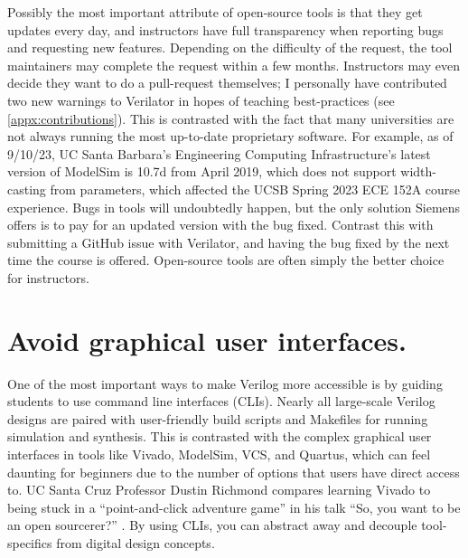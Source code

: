 Possibly the most important attribute of open-source tools is that they get updates every day, and instructors have full transparency when reporting bugs and requesting new features. Depending on the difficulty of the request, the tool maintainers may complete the request within a few months. Instructors may even decide they want to do a pull-request themselves; I personally have contributed two new warnings to Verilator in hopes of teaching best-practices (see \autoref{appx:contributions}). This is contrasted with the fact that many universities are not always running the most up-to-date proprietary software. For example, as of 9/10/23, UC Santa Barbara's Engineering Computing Infrastructure's latest version of ModelSim is 10.7d from April 2019, which does not support width-casting from parameters, which affected the UCSB Spring 2023 ECE 152A course experience. Bugs in tools will undoubtedly happen, but the only solution Siemens offers is to pay for an updated version with the bug fixed. Contrast this with submitting a GitHub issue with Verilator, and having the bug fixed by the next time the course is offered. Open-source tools are often simply the better choice for instructors.

\section{Avoid graphical user interfaces.}

One of the most important ways to make Verilog more accessible is by guiding students to use command line interfaces (CLIs). Nearly all large-scale Verilog designs are paired with user-friendly build scripts and Makefiles for running simulation and synthesis. This is contrasted with the complex graphical user interfaces in tools like Vivado, ModelSim, VCS, and Quartus, which can feel daunting for beginners due to the number of options that users have direct access to. UC Santa Cruz Professor Dustin Richmond compares learning Vivado to being stuck in a \enquote{point-and-click adventure game} in his talk \enquote{So, you want to be an open sourcerer?} \cite{RichmondLatchUp}. By using CLIs, you can abstract away and decouple tool-specifics from digital design concepts.


